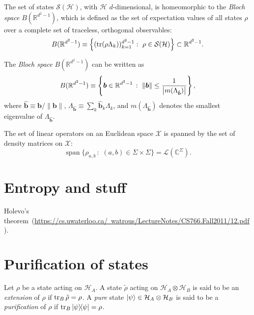 \documentclass[12pt]{report}
\newcommand{\CC}{\mathbb{C}}
\newcommand{\RR}{\mathbb{R}}
\newcommand{\on}[1]{\operatorname{#1}}
\newcommand{\bs}[1]{\boldsymbol{#1}}
\newcommand{\calH}{{\mathcal{H}}}
\newcommand{\calL}{{\mathcal{L}}}
\newcommand{\calS}{{\mathcal{S}}}
\newcommand{\calX}{{\mathcal{X}}}
\begin{document}
\begin{prop}
	The set of states $\calS(\calH)$, with $\calH$ $d$-dimensional, is homeomorphic to the \emph{Bloch space} $B(\RR^{d^2-1})$, which is defined as the set of expectation values of all states $\rho$ over a complete set of traceless, orthogonal observables:
	\begin{equation}
		B(\RR^{d^2-1})\equiv\left\{
			(\tr(\rho\Lambda_k))_{k=1}^{d^2-1}:\,\,\rho\in\calS(\calH)
		\right\} \subset \RR^{d^2-1}.
	\end{equation}
\end{prop}

\begin{prop}
	The \emph{Bloch space} $B(\RR^{d^2-1})$ can be written as
	\begin{equation}
		B(\RR^{d^2-1}) \equiv \left\{
			\bs b\in\RR^{d^2-1}\,:\,\,\|\bs b\|\le\frac{1}{\abs{m(\Lambda_{\hat{\bs b}})}}
		\right\},
	\end{equation}
	where $\hat{\bs b}\equiv\bs b/\|\bs b\|$, $\Lambda_{\hat{\bs b}}\equiv\sum_k \hat{\bs b}_k \Lambda_k$, and $m(\Lambda_{\hat{\bs b}})$ denotes the smallest eigenvalue of $\Lambda_{\hat{\bs b}}$.
\end{prop}

\begin{prop}[a]
	The set of linear operators on an Euclidean space $\calX$ is spanned by the set of density matrices on $\calX$:
	\begin{equation}
		\on{span}\{\rho_{a,b}\,:\,\,(a,b)\in\Sigma\times\Sigma\}
		= \calL(\CC^\Sigma).
	\end{equation}
\end{prop}


\section{Entropy and stuff}
Holevo's theorem~(\href{Watrous notes, chapter 12}{https://cs.uwaterloo.ca/~watrous/LectureNotes/CS766.Fall2011/12.pdf}).

\section{Purification of states}

\begin{defn}
	Let $\rho$ be a state acting on $\calH_A$.
	A state $\tilde\rho$ acting on $\calH_A\otimes\calH_B$ is said to be an \emph{extension} of $\rho$ if $\tr_B\tilde\rho=\rho$.
	A \emph{pure} state $\ket\psi\in\calH_A\otimes\calH_B$ is said to be a \emph{purification} of $\rho$ if $\tr_B\ketbra\psi=\rho$.
\end{defn}
\end{document}
